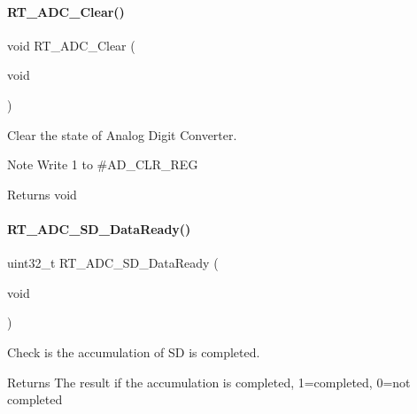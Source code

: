\paragraph{\texorpdfstring{R\+T\+\_\+\+A\+D\+C\+\_\+\+Clear()}{RT\_ADC\_Clear()}}
{\footnotesize\ttfamily void R\+T\+\_\+\+A\+D\+C\+\_\+\+Clear (\begin{DoxyParamCaption}\item[{void}]{ }\end{DoxyParamCaption})\hspace{0.3cm}{\ttfamily [inline]}}



Clear the state of Analog Digit Converter. 

\begin{DoxyNote}{Note}
Write 1 to \#\+A\+D\+\_\+\+C\+L\+R\+\_\+\+R\+EG 
\end{DoxyNote}
\begin{DoxyReturn}{Returns}
void 
\end{DoxyReturn}
\mbox{\label{a00002_a7fd97b414a33170e6013c88f37e028a9}} 
\paragraph{\texorpdfstring{R\+T\+\_\+\+A\+D\+C\+\_\+\+S\+D\+\_\+\+Data\+Ready()}{RT\_ADC\_SD\_DataReady()}}
{\footnotesize\ttfamily uint32\+\_\+t R\+T\+\_\+\+A\+D\+C\+\_\+\+S\+D\+\_\+\+Data\+Ready (\begin{DoxyParamCaption}\item[{void}]{ }\end{DoxyParamCaption})\hspace{0.3cm}{\ttfamily [inline]}}



Check is the accumulation of SD is completed. 

\begin{DoxyReturn}{Returns}
The result if the accumulation is completed, 1=completed, 0=not completed 
\end{DoxyReturn}
\mbox{\label{a00002_a1934526cb3d40a1b0ae7a0f19597a4ff}} 
